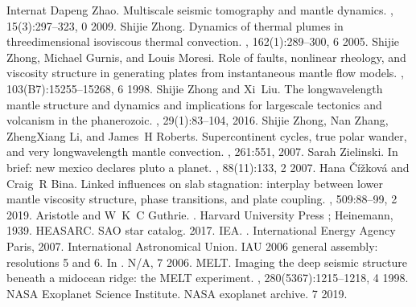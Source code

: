 \documentclass[letterpaper,10pt,english]{jupyterBook}
\begin{document}
\begin{sphinxthebibliography}{Internat}
Dapeng Zhao. Multiscale seismic tomography and mantle dynamics. , 15(3):297–323, 0 2009.
\sphinxAtStartPar
Shijie Zhong. Dynamics of thermal plumes in three\sphinxhyphen{}dimensional isoviscous thermal convection. , 162(1):289–300, 6 2005.
\sphinxAtStartPar
Shijie Zhong, Michael Gurnis, and Louis Moresi. Role of faults, nonlinear rheology, and viscosity structure in generating plates from instantaneous mantle flow models. , 103(B7):15255–15268, 6 1998.
\sphinxAtStartPar
Shijie Zhong and Xi Liu. The long\sphinxhyphen{}wavelength mantle structure and dynamics and implications for large\sphinxhyphen{}scale tectonics and volcanism in the phanerozoic. , 29(1):83–104, 2016.
\sphinxAtStartPar
Shijie Zhong, Nan Zhang, Zheng\sphinxhyphen{}Xiang Li, and James H Roberts. Supercontinent cycles, true polar wander, and very long\sphinxhyphen{}wavelength mantle convection. , 261:551, 2007.
\sphinxAtStartPar
Sarah Zielinski. In brief: new mexico declares pluto a planet. , 88(11):133, 2 2007.
\sphinxAtStartPar
Hana Čížková and Craig R Bina. Linked influences on slab stagnation: interplay between lower mantle viscosity structure, phase transitions, and plate coupling. , 509:88–99, 2 2019.
\sphinxAtStartPar
Aristotle and W K C Guthrie. . Harvard University Press ; Heinemann, 1939.
\sphinxAtStartPar
HEASARC. SAO star catalog. 2017.
\sphinxAtStartPar
IEA. . International Energy Agency Paris, 2007.
\sphinxAtStartPar
International Astronomical Union. IAU 2006 general assembly: resolutions 5 and 6. In . N/A, 7 2006.
\sphinxAtStartPar
MELT. Imaging the deep seismic structure beneath a mid\sphinxhyphen{}ocean ridge: the MELT experiment. , 280(5367):1215–1218, 4 1998.
\sphinxAtStartPar
NASA Exoplanet Science Institute. NASA exoplanet archive. 7 2019.
\end{sphinxthebibliography}







\renewcommand{\indexname}{Index}
\printindex
\end{document}
